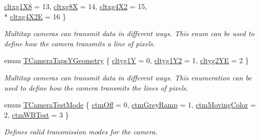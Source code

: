 \begin{DoxyCompactItemize}
\hyperlink{group___device_specific_interface_gga25ba65893f1ee0e7de99cb51bb858d99ad8f17bf247977e8623f074204e068590}{cltxg1\+X8} = 13, 
\hyperlink{group___device_specific_interface_gga25ba65893f1ee0e7de99cb51bb858d99a8a02cbc27f41153fc368296221df12cb}{cltxg8\+X} = 14, 
\hyperlink{group___device_specific_interface_gga25ba65893f1ee0e7de99cb51bb858d99a203dd2469470f2551ce3904eb6672a4c}{cltxg4\+X2} = 15, 
\\*
\hyperlink{group___device_specific_interface_gga25ba65893f1ee0e7de99cb51bb858d99a1862ff0e481594cb4337c30ed123c13a}{cltxg4\+X2\+E} = 16
 \}
\begin{DoxyCompactList}\small\item\em Multitap cameras can transmit data in different ways. This enum can be used to define how the camera transmits a line of pixels. \end{DoxyCompactList}\item 
enum \hyperlink{group___device_specific_interface_ga03c8b70bb46d82e4f9f4a8c154d7261c}{T\+Camera\+Taps\+Y\+Geometry} \{ \hyperlink{group___device_specific_interface_gga03c8b70bb46d82e4f9f4a8c154d7261ca6b375f8cf6e8e54cf198fb7b6a04925d}{cltyg1\+Y} = 0, 
\hyperlink{group___device_specific_interface_gga03c8b70bb46d82e4f9f4a8c154d7261ca6a4abd08887d8f87b0231fc612f68e40}{cltyg1\+Y2} = 1, 
\hyperlink{group___device_specific_interface_gga03c8b70bb46d82e4f9f4a8c154d7261ca1b50f7c4e869cb117a6e6ad526c1a83c}{cltyg2\+Y\+E} = 2
 \}
\begin{DoxyCompactList}\small\item\em Multitap cameras can transmit data in different ways. This enumeration can be used to define how the camera transmits the lines of pixels. \end{DoxyCompactList}\item 
enum \hyperlink{group___device_specific_interface_ga6e439707d908a0a14e9df8e190df76aa}{T\+Camera\+Test\+Mode} \{ \hyperlink{group___device_specific_interface_gga6e439707d908a0a14e9df8e190df76aaae508f4fe89cee8bc7a6d9b72fd82c481}{ctm\+Off} = 0, 
\hyperlink{group___device_specific_interface_gga6e439707d908a0a14e9df8e190df76aaa67fb1a4c8c09df7568634d15e3d6a8f6}{ctm\+Grey\+Ramp} = 1, 
\hyperlink{group___device_specific_interface_gga6e439707d908a0a14e9df8e190df76aaa8aea4c3f206ca2649ef4fa0b9a423f4a}{ctm\+Moving\+Color} = 2, 
\hyperlink{group___device_specific_interface_gga6e439707d908a0a14e9df8e190df76aaacf0e48676e209b0e93439e18c4f2885a}{ctm\+W\+B\+Test} = 3
 \}
\begin{DoxyCompactList}\small\item\em Defines valid transmission modes for the camera. \end{DoxyCompactList}\item 

\end{DoxyCompactItemize}
